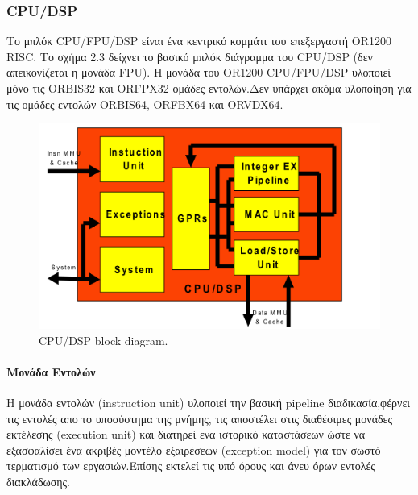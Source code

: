 \documentclass[a4paper,10pt]{article}
\numberwithin{figure}{subsection}
\numberwithin{table}{subsection}
\begin{document}
{\subsubsection{CPU/DSP}
Το μπλόκ CPU/FPU/DSP είναι ένα κεντρικό κομμάτι του επεξεργαστή OR1200 RISC. Το σχήμα 2.3 δείχνει
το βασικό μπλόκ διάγραμμα του CPU/DSP (δεν απεικονίζεται η μονάδα FPU). Η μονάδα του OR1200 CPU/FPU/DSP
υλοποιεί μόνο τις ORBIS32 και ORFPX32 ομάδες εντολών.Δεν υπάρχει ακόμα υλοποίηση για τις
ομάδες εντολών ORBIS64, ORFBX64 και ORVDX64.

\vspace{0.7cm}
\begin{figure}[h!]
 \centering
 \includegraphics[bb=0 0 1020 613,scale=0.35]{./Images/cpu-dsp.png}
 \caption{CPU/DSP block diagram.}
\end{figure}

\vspace{0.7cm}

\paragraph{Μονάδα Εντολών\newline\newline}

Η μονάδα εντολών (instruction unit) υλοποιεί την βασική pipeline διαδικασία,φέρνει τις
εντολές απο το υποσύστημα της μνήμης, τις αποστέλει στις διαθέσιμες μονάδες εκτέλεσης (execution unit)
και διατηρεί ενα ιστορικό καταστάσεων ώστε να εξασφαλίσει ένα ακριβές μοντέλο εξαιρέσεων (exception model)
για τον σωστό τερματισμό των εργασιών.Επίσης εκτελεί τις υπό όρους και άνευ όρων εντολές διακλάδωσης.
\newline

}
\end{document}
